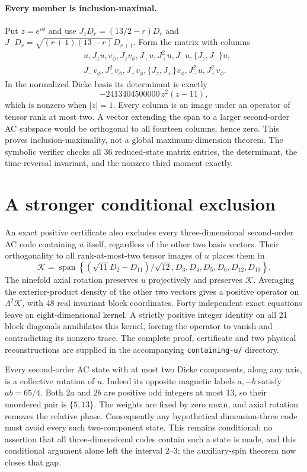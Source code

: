 \documentclass[11pt]{article}
\begin{document}
\paragraph{Every member is inclusion-maximal.}
Put $z=e^{i\phi}$ and use $J_zD_r=(13/2-r)D_r$ and
$J_-D_r=\sqrt{(r+1)(13-r)}D_{r+1}$. Form the matrix with columns
\begin{align*}
 &u,J_zu,v_\phi,J_zv_\phi,J_+u,J_+^2u,J_-u,\{J_z,J_-\}u,\\
 &J_-v_\phi,J_-^2v_\phi,J_+v_\phi,\{J_z,J_+\}v_\phi,J_-^2u,J_+^2v_\phi.
\end{align*}
In the normalized Dicke basis its determinant is exactly
\[
 -2413404500000\,z^2(z-11),
\]
which is nonzero when $|z|=1$. Every column is an image under an operator
of tensor rank at most two. A vector extending the span to a larger second-order
AC subspace would be orthogonal to all fourteen columns, hence zero.
This proves inclusion-maximality, not a global maximum-dimension theorem.
The symbolic verifier checks all 36 reduced-state matrix entries, the determinant,
the time-reversal invariant, and the nonzero third moment exactly.
\section*{A stronger conditional exclusion}
An exact positive certificate also excludes every three-dimensional second-order
AC code containing $u$ itself, regardless of the other two basis vectors.
Their orthogonality to all rank-at-most-two tensor images of $u$ places them in
\[
\mathcal K=\operatorname{span}\left\{(\sqrt{11}D_2-D_{11})/\sqrt{12},
D_3,D_4,D_5,D_6,D_{12},D_{13}\right\}.
\]
The ninefold axial rotation preserves $u$ projectively and preserves $\mathcal K$.
Averaging the exterior-product density of the other two vectors gives a positive
operator on $\Lambda^2\mathcal K$, with 48 real invariant block coordinates.
Forty independent exact equations leave an eight-dimensional kernel. A strictly
positive integer identity on all 21 block diagonals annihilates this kernel,
forcing the operator to vanish and contradicting its nonzero trace.
The complete proof, certificate and two physical reconstructions are supplied
in the accompanying \texttt{containing-u/} directory.

Every second-order AC state with at most two Dicke components, along any axis,
is a collective rotation of $u$. Indeed its opposite magnetic labels $a,-b$
satisfy $ab=65/4$. Both $2a$ and $2b$ are positive odd integers at most 13,
so their unordered pair is $\{5,13\}$. The weights are fixed by zero mean,
and axial rotation removes the relative phase. Consequently any hypothetical
dimension-three code must avoid every such two-component state.
This remains conditional: no assertion that all three-dimensional codes contain
such a state is made, and this conditional argument alone left the interval $2$--$3$; the auxiliary-spin theorem now closes that gap.
\end{document}

